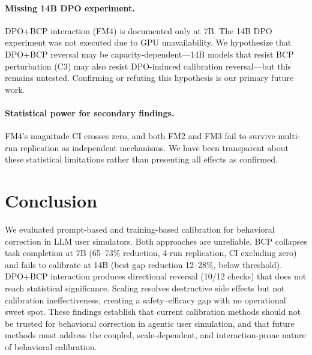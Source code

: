 \documentclass[11pt,a4paper]{article}
\begin{document}
\paragraph{Missing 14B DPO experiment.}
DPO+BCP interaction (FM4) is documented only at 7B.
The 14B DPO experiment was not executed due to GPU unavailability.
We hypothesize that DPO+BCP reversal may be capacity-dependent---14B models that resist BCP perturbation (C3) may also resist DPO-induced calibration reversal---but this remains untested.
Confirming or refuting this hypothesis is our primary future work.

\paragraph{Statistical power for secondary findings.}
FM4's magnitude CI crosses zero, and both FM2 and FM3 fail to survive multi-run replication as independent mechanisms.
We have been transparent about these statistical limitations rather than presenting all effects as confirmed.

\section{Conclusion}
\label{sec:conclusion}

We evaluated prompt-based and training-based calibration for behavioral correction in LLM user simulators.
Both approaches are unreliable.
BCP collapses task completion at 7B (65--73\% reduction, 4-run replication, CI excluding zero) and fails to calibrate at 14B (best gap reduction 12--28\%, below threshold).
DPO+BCP interaction produces directional reversal (10/12 checks) that does not reach statistical significance.
Scaling resolves destructive side effects but not calibration ineffectiveness, creating a safety--efficacy gap with no operational sweet spot.
These findings establish that current calibration methods should not be trusted for behavioral correction in agentic user simulation, and that future methods must address the coupled, scale-dependent, and interaction-prone nature of behavioral calibration.


\end{document}
